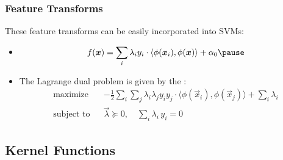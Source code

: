 \begin{frame}
  \frametitle{Feature Transforms \cont}
  
  These feature transforms can be easily incorporated into SVMs:\\[.25cm]
  
  \begin{itemize}
    \item {}
      {\small
        \begin{displaymath}
          f(\vec x) = \sum_i \lambda_i y_i \cdot  \langle\phi(\vec x_i), \phi(\vec x) \rangle + \alpha_0 \pause
        \end{displaymath}
      }
    \item The Lagrange dual problem is given by the :
      {\small
        \begin{eqnarray*}
          \mbox{maximize}  & & -\frac{1}{2} \sum_i \sum_j \lambda_i \lambda_j y_i y_j \cdot \langle\phi(\vec x_i),\phi(\vec x_j)\rangle + \sum_i \lambda_i \\[.5cm]
          \mbox{subject to} & &\vec{\lambda}\succeq 0, \quad \sum_{i} \lambda_i \, y_i = 0
        \end{eqnarray*}
      }
  \end{itemize}
\end{frame}


\subsection{Kernel Functions}

